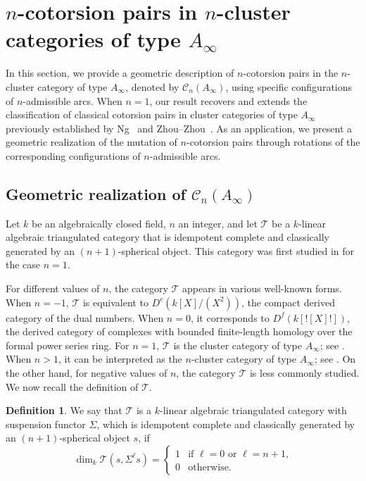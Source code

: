 \documentclass[a4paper,reqno,11pt]{amsart}
\theoremstyle{definition}
\newtheorem{definition}[theorem]{Definition}
\def\C{\mathcal{C}}
\def\T{\mathcal{T}}
\def \text{\mbox}
\begin{document}
\section{$n$-cotorsion pairs in $n$-cluster categories of type $A_{\infty}$}
In this section, we provide a geometric description of  $n$-cotorsion pairs in the $n$-cluster category of type $A_{\infty}$, denoted by $\C_n(A_{\infty})$, using specific configurations of $n$-admissible arcs. When $n = 1$, our result recovers and extends the classification of classical cotorsion pairs in cluster categories of type $A_{\infty}$ previously established by Ng~\cite{Ng} and Zhou--Zhou~\cite{ZZ}. As an application, we present a geometric realization of the mutation of $n$-cotorsion pairs through rotations of the corresponding configurations of $n$-admissible arcs.

\subsection{Geometric realization of $\C_n(A_{\infty})$}
Let $k$ be an algebraically closed field, $n$ an integer, and let $\T$ be a $k$-linear algebraic triangulated category that is idempotent complete and classically generated by an $(n+1)$-spherical object. This category was first studied in \cite{J} for the case $n = 1$.

For different values of $n$, the category $\T$ appears in various well-known forms. When $n = -1$, $\T$ is equivalent to $D^c(k[X]/(X^2))$, the compact derived category of the dual numbers. When $n = 0$, it corresponds to $D^f(k[![X]!])$, the derived category of complexes with bounded finite-length homology over the formal power series ring. For $n = 1$, $\T$ is the cluster category of type $A_{\infty}$; see \cite{HJ}. When $n > 1$, it can be interpreted as the $n$-cluster category of type $A_{\infty}$; see \cite{HJ1}. On the other hand, for negative values of $n$, the category $\T$ is less commonly studied. We now recall the definition of $\T$.

\begin{definition}\cite[Definition 1.1]{HJ1}
We say that $\T$ is a $k$-linear algebraic triangulated category with suspension functor $\Sigma$, which is idempotent complete and classically generated by an $(n+1)$-spherical object $s$, if
\[
\dim_k\T(s,\Sigma^{\ell} s)=\left\{
\begin{array}{cl}
1  & \text{if\ $\ell = 0$ or $\ell = n+1$,} \\
0  & \text{otherwise.}
\end{array}
\right.
\]



\end{definition}
\end{document}
